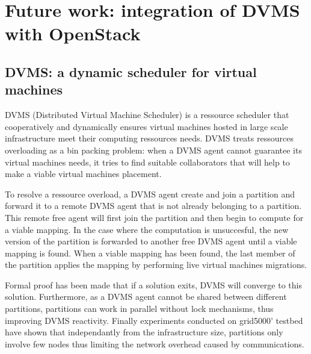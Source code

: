 \section{Future work: integration of DVMS with OpenStack}
\label{sec:future_work}

\subsection{DVMS: a dynamic scheduler for virtual machines}






DVMS \cite{quesnel:ispa2013} (Distributed Virtual Machine Scheduler) is a
ressource scheduler that cooperatively and dynamically ensures virtual machines
hosted in large scale infrastructure meet their computing ressources needs. DVMS
treats ressources overloading as a bin packing problem: when a DVMS agent cannot
guarantee its virtual machines needs, it tries to find suitable collaborators 
that will help to make a viable virtual machines placement.

To resolve a ressource overload, a DVMS agent create and join a partition and
forward it to a remote DVMS agent that is not already belonging to a partition.
This remote free agent will first join the partition and then begin to compute 
for a viable mapping. In the case where the computation is unsuccesful, the new 
version of the partition is forwarded to another free DVMS agent until a viable
mapping is found. When a viable mapping has been found, the last member of the
partition applies the mapping by performing live virtual machines migrations.



Formal proof \cite{quesnel:ispa2013} has been made that if a solution exits, 
DVMS will converge to this solution. Furthermore, as a DVMS agent cannot be
shared between different partitions, partitions can work in parallel without
lock mechanisms, thus improving DVMS reactivity. Finally experiments conducted 
on grid5000' testbed have shown that independantly from the infrastructure 
size, partitions only involve few nodes thus limiting the network overhead 
caused by communications.



